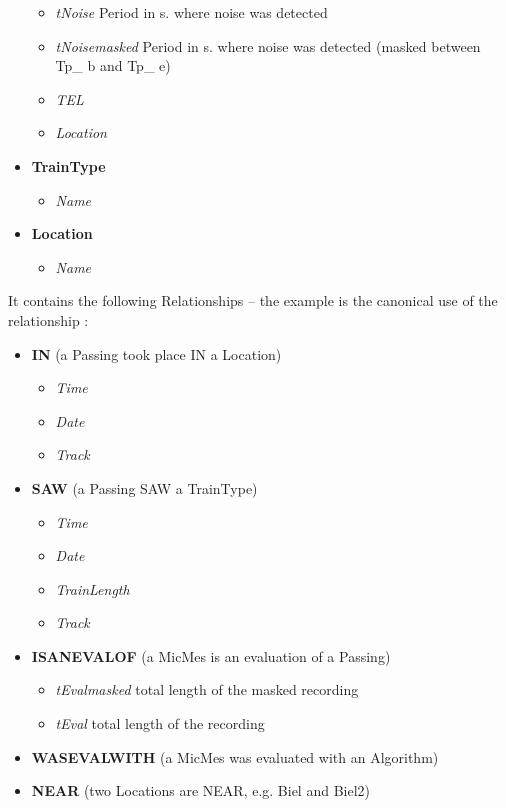 \documentclass{article}\usepackage[]{graphicx}\usepackage[]{color}
\begin{document}
\begin{itemize}
\begin{itemize}
    \item {\it tNoise} Period in s. where noise was detected
    \item {\it tNoisemasked} Period in s. where noise was detected (masked between Tp\_ b and Tp\_ e)
    \item {\it TEL}
    \item {\it Location}
  \end{itemize}
\item {\bf TrainType}
  \begin{itemize}
    \item {\it Name}
  \end{itemize}
\item {\bf Location}
  \begin{itemize}
    \item {\it Name}
  \end{itemize}
\end{itemize}
It contains the following Relationships -- the example is the canonical use of the relationship :
\begin{itemize}
\item {\bf IN} (a Passing took place IN a Location)
  \begin{itemize}
    \item {\it Time}
    \item {\it Date}
    \item {\it Track}
  \end{itemize}
\item {\bf SAW} (a Passing SAW a TrainType)
  \begin{itemize}
    \item {\it Time}
    \item {\it Date}
    \item {\it TrainLength}
    \item {\it Track}
  \end{itemize}
\item {\bf ISANEVALOF} (a MicMes is an evaluation of a Passing)
  \begin{itemize}
    \item {\it tEvalmasked} total length of the masked recording
    \item {\it tEval} total length of the recording
  \end{itemize}
\item {\bf WASEVALWITH} (a MicMes was evaluated with an Algorithm)
\item {\bf NEAR} (two Locations are NEAR, e.g. Biel and Biel2)
\end{itemize}
\end{document}
